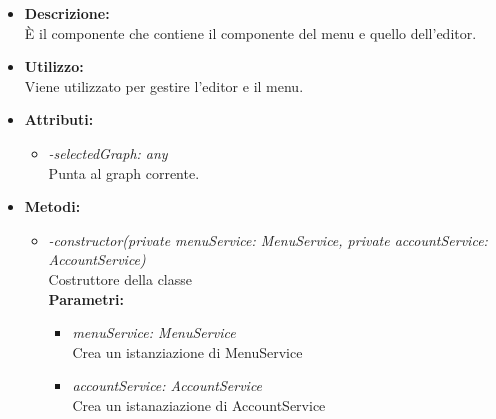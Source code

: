 \begin{itemize}
	\item \textbf{Descrizione:}\\
	È il componente che contiene il componente del menu e quello dell'editor.
	\item \textbf{Utilizzo:}\\
	Viene utilizzato per gestire l'editor e il menu.
	\item \textbf{Attributi:}
		\begin{itemize}
			\item \emph{-selectedGraph: any}\\
			Punta al graph corrente.
		\end{itemize}
	\item \textbf{Metodi:}
		\begin{itemize}
			\item \emph{-constructor(private menuService: MenuService,
    private accountService: AccountService)}\\
    		Costruttore della classe\\
    		\textbf{Parametri:}
    		\begin{itemize}
    			\item \emph{menuService: MenuService}\\
    			Crea un istanziazione di MenuService  			
    			\item \emph{accountService: AccountService}\\
    			Crea un istanaziazione di AccountService
    		\end{itemize}
    	\end{itemize}
\end{itemize}